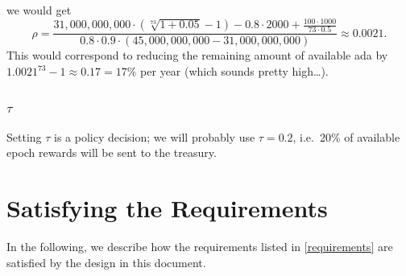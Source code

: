 \documentclass[11pt,a4paper,dvipsnames,twosided]{article}
\begin{document}
we would get \[
    \rho=\frac
        {31,000,000,000\cdot\left(\sqrt[73]{1+0.05}-1\right)-0.8\cdot 2000+\frac{100\cdot 1000}{73\cdot 0.5}}
        {0.8\cdot 0.9\cdot\left(45,000,000,000 - 31,000,000,000\right)}
    \approx
    0.0021.
\] This would correspond to reducing the remaining amount of available
ada by \({1.0021}^{73}-1\approx 0.17=17\%\) per year (which sounds
pretty high\ldots).

\subsubsection{\texorpdfstring{\(\tau\)}{\textbackslash{}tau}}

Setting \(\tau\) is a policy decision; we will probably use
\(\tau=0.2\), i.e.~20\% of available epoch rewards will be sent to the
treasury.

\section{Satisfying the Requirements}
\label{satisfying-the-requirements}

In the following, we describe how the requirements listed in
\cref{requirements} are satisfied by the design in this document.
\end{document}
